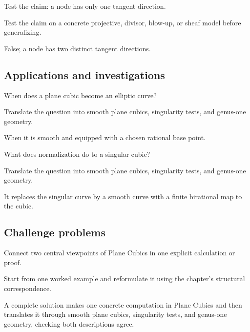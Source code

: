 \begin{exercise}\label{exr:vi43-expand-12}
Test the claim: a node has only one tangent direction.
\end{exercise}
\begin{hint}
Test the claim on a concrete projective, divisor, blow-up, or sheaf model before generalizing.
\end{hint}
\begin{solution}
False; a node has two distinct tangent directions.
\end{solution}

\subsection*{Applications and investigations}

\begin{exercise}\label{exr:vi43-expand-13}
When does a plane cubic become an elliptic curve?
\end{exercise}
\begin{hint}
Translate the question into smooth plane cubics, singularity tests, and genus-one geometry.
\end{hint}
\begin{solution}
When it is smooth and equipped with a chosen rational base point.
\end{solution}

\begin{exercise}[Normalization]\label{exr:vi43-expand-14}
What does normalization do to a singular cubic?
\end{exercise}
\begin{hint}
Translate the question into smooth plane cubics, singularity tests, and genus-one geometry.
\end{hint}
\begin{solution}
It replaces the singular curve by a smooth curve with a finite birational map to the cubic.
\end{solution}

\subsection*{Challenge problems}

\begin{exercise}\label{exr:vi43-expand-15}
Connect two central viewpoints of Plane Cubics in one explicit calculation or proof.
\end{exercise}
\begin{hint}
Start from one worked example and reformulate it using the chapter's structural correspondence.
\end{hint}
\begin{solution}
A complete solution makes one concrete computation in Plane Cubics and then translates it through smooth plane cubics, singularity tests, and genus-one geometry, checking both descriptions agree.
\end{solution}

